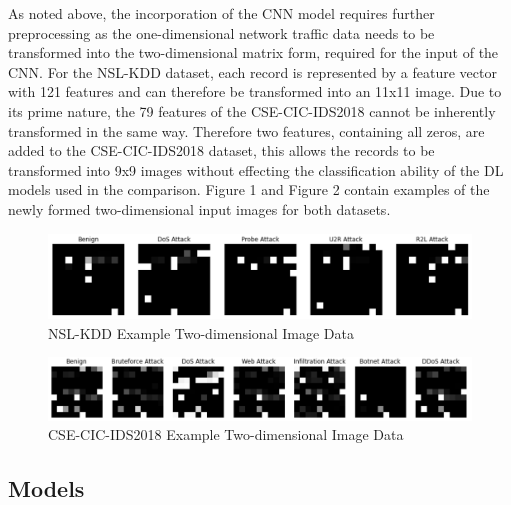 \documentclass[conference]{IEEEtran}
\begin{document}
As noted above, the incorporation of the CNN model requires further preprocessing as the one-dimensional network traffic data needs to be transformed into the two-dimensional matrix form, required for the input of the CNN. For the NSL-KDD dataset, each record is represented by a feature vector with 121 features and can therefore be transformed into an 11x11 image. Due to its prime nature, the 79 features of the CSE-CIC-IDS2018 cannot be inherently transformed in the same way. Therefore two features, containing all zeros, are added to the CSE-CIC-IDS2018 dataset, this allows the records to be transformed into 9x9 images without effecting the classification ability of the DL models used in the comparison. Figure 1 and Figure 2 contain examples of the newly formed two-dimensional input images for both datasets. 



\begin{figure}[htbp]
\centerline{\includegraphics[scale=0.5]{images/nsl_kdd_classes.png}}
\caption{NSL-KDD Example Two-dimensional Image Data}
\label{fig}
\end{figure}

\begin{figure}[htbp]
\centerline{\includegraphics[scale=0.5]{images/cic_cse_classes.png}}
\caption{CSE-CIC-IDS2018 Example Two-dimensional Image Data}
\label{fig}
\end{figure}



\subsection{Models}
\end{document}

